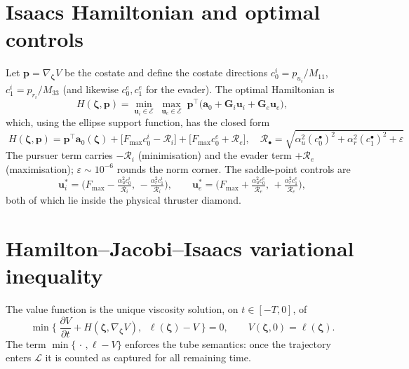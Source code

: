 \documentclass[11pt]{article}
\newcommand{\zvec}{\boldsymbol{\zeta}}
\newcommand{\pvec}{\boldsymbol{p}}
\begin{document}
\section{Isaacs Hamiltonian and optimal controls}
Let $\pvec=\nabla_{\zvec}V$ be the costate and define the costate directions
$c_0^{i}=p_{u_i}/M_{11}$, $c_1^{i}=p_{r_i}/M_{33}$ (and likewise $c_0^{e},c_1^{e}$
for the evader). The optimal Hamiltonian is
\begin{equation}
H(\zvec,\pvec)=\min_{\mathbf{u}_i\in\mathcal{E}}\;\max_{\mathbf{u}_e\in\mathcal{E}}\;
\pvec^{\top}\!\big(\mathbf{a}_0+\mathbf{G}_i\mathbf{u}_i+\mathbf{G}_e\mathbf{u}_e\big),
\end{equation}
which, using the ellipse support function, has the closed form
\begin{equation}
\boxed{\;
H(\zvec,\pvec)=\pvec^{\top}\mathbf{a}_0(\zvec)
+\big[F_{\max}c_0^{i}-\mathcal{R}_i\big]
+\big[F_{\max}c_0^{e}+\mathcal{R}_e\big],\quad
\mathcal{R}_\bullet=\sqrt{\alpha_u^2 (c_0^\bullet)^2+\alpha_r^2 (c_1^\bullet)^2+\varepsilon}\; }
\end{equation}
The pursuer term carries $-\mathcal{R}_i$ (minimisation) and the evader term
$+\mathcal{R}_e$ (maximisation); $\varepsilon\sim10^{-6}$ rounds the norm corner.
The saddle-point controls are
\begin{equation}
\mathbf{u}_i^{\ast}=\Big(F_{\max}-\tfrac{\alpha_u^2 c_0^{i}}{\mathcal{R}_i},\,
-\tfrac{\alpha_r^2 c_1^{i}}{\mathcal{R}_i}\Big),\qquad
\mathbf{u}_e^{\ast}=\Big(F_{\max}+\tfrac{\alpha_u^2 c_0^{e}}{\mathcal{R}_e},\,
+\tfrac{\alpha_r^2 c_1^{e}}{\mathcal{R}_e}\Big),
\end{equation}
both of which lie inside the physical thruster diamond.

\section{Hamilton--Jacobi--Isaacs variational inequality}
The value function is the unique viscosity solution, on $t\in[-T,0]$, of
\begin{equation}
\boxed{\;
\min\Big\{\;\frac{\partial V}{\partial t}+H(\zvec,\nabla_{\zvec}V),\;\;
\ell(\zvec)-V\;\Big\}=0,\qquad V(\zvec,0)=\ell(\zvec).\;}
\label{eq:hjivi}
\end{equation}
The term $\min\{\,\cdot\,,\ell-V\}$ enforces the tube semantics: once the trajectory
enters $\mathcal{L}$ it is counted as captured for all remaining time.
\end{document}
